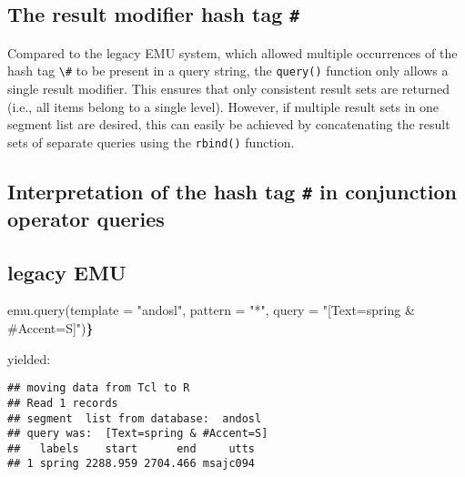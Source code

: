 \documentclass[
]{book}
\newenvironment{Shaded}{\begin{snugshade}}{\end{snugshade}}
\newcommand{\AttributeTok}[1]{\textcolor[rgb]{0.77,0.63,0.00}{#1}}
\newcommand{\ErrorTok}[1]{\textcolor[rgb]{0.64,0.00,0.00}{\textbf{#1}}}
\newcommand{\FunctionTok}[1]{\textcolor[rgb]{0.00,0.00,0.00}{#1}}
\newcommand{\NormalTok}[1]{#1}
\newcommand{\StringTok}[1]{\textcolor[rgb]{0.31,0.60,0.02}{#1}}
\begin{document}
\hypertarget{the-result-modifier-hash-tag}{%
\subsection{\texorpdfstring{The result modifier hash tag \texttt{\#}}{The result modifier hash tag \#}}\label{the-result-modifier-hash-tag}}

Compared to the legacy EMU system, which allowed multiple occurrences of the hash tag \texttt{\textbackslash{}\#} to be present in a query string, the \texttt{query()} function only allows a single result modifier. This ensures that only consistent result sets are returned (i.e., all items belong to a single level). However, if multiple result sets in one segment list are desired, this can easily be achieved by concatenating the result sets of separate queries using the \texttt{rbind()} function.

\hypertarget{interpretation-of-the-hash-tag-in-conjunction-operator-queries}{%
\subsection{\texorpdfstring{Interpretation of the hash tag \texttt{\#} in conjunction operator queries}{Interpretation of the hash tag \# in conjunction operator queries}}\label{interpretation-of-the-hash-tag-in-conjunction-operator-queries}}

\hypertarget{legacy-emu}{%
\subsection{legacy EMU}\label{legacy-emu}}

\begin{Shaded}
\begin{Highlighting}[]
\FunctionTok{emu.query}\NormalTok{(}\AttributeTok{template =} \StringTok{"andosl"}\NormalTok{, }
          \AttributeTok{pattern =} \StringTok{"*"}\NormalTok{,}
          \AttributeTok{query =} \StringTok{"[Text=spring \& \#Accent=S]"}\NormalTok{)}\ErrorTok{\}}
\end{Highlighting}
\end{Shaded}

yielded:

\begin{verbatim}
## moving data from Tcl to R
## Read 1 records
## segment  list from database:  andosl
## query was:  [Text=spring & #Accent=S]
##   labels    start      end     utts
## 1 spring 2288.959 2704.466 msajc094
\end{verbatim}
\end{document}
